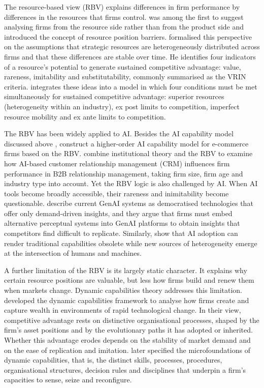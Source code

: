The resource-based view (RBV) explains differences in firm performance by differences in the resources that firms control. \textcite[171]{wernerfelt1984} was among the first to suggest analysing firms from the resource side rather than from the product side and introduced the concept of resource position barriers. \textcite[99]{barney1991} formalised this perspective on the assumptions that strategic resources are heterogeneously distributed across firms and that these differences are stable over time. He identifies four indicators of a resource's potential to generate sustained competitive advantage: value, rareness, imitability and substitutability, commonly summarised as the VRIN criteria. \textcite[179]{peteraf1993} integrates these ideas into a model in which four conditions must be met simultaneously for sustained competitive advantage: superior resources (heterogeneity within an industry), ex post limits to competition, imperfect resource mobility and ex ante limits to competition.

The RBV has been widely applied to AI. Besides the AI capability model discussed above \parencite[1]{mikalef2021capability}, \textcite[1]{chen2022} construct a higher-order AI capability model for e-commerce firms based on the RBV. \textcite[205]{chatterjee2021} combine institutional theory and the RBV to examine how AI-based customer relationship management (CRM) influences firm performance in B2B relationship management, taking firm size, firm age and industry type into account. Yet the RBV logic is also challenged by AI. When AI tools become broadly accessible, their rareness and inimitability become questionable. \textcite[583]{cui2024} describe current GenAI systems as democratised technologies that offer only demand-driven insights, and they argue that firms must embed alternative perceptual systems into GenAI platforms to obtain insights that competitors find difficult to replicate. Similarly, \textcite[1425]{krakowski2023} show that AI adoption can render traditional capabilities obsolete while new sources of heterogeneity emerge at the intersection of humans and machines.

A further limitation of the RBV is its largely static character. It explains why certain resource positions are valuable, but less how firms build and renew them when markets change. Dynamic capabilities theory addresses this limitation. \textcite[509]{teece1997} developed the dynamic capabilities framework to analyse how firms create and capture wealth in environments of rapid technological change. In their view, competitive advantage rests on distinctive organisational processes, shaped by the firm's asset positions and by the evolutionary paths it has adopted or inherited. Whether this advantage erodes depends on the stability of market demand and on the ease of replication and imitation. \textcite[1319]{teece2007} later specified the microfoundations of dynamic capabilities, that is, the distinct skills, processes, procedures, organisational structures, decision rules and disciplines that underpin a firm's capacities to sense, seize and reconfigure.

